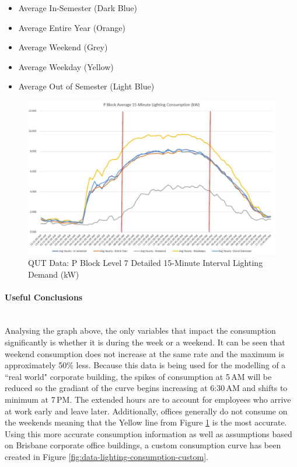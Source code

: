 \begin{itemize} [noitemsep]
	\item Average In-Semester (Dark Blue)
	\item Average Entire Year (Orange)
	\item Average Weekend (Grey)
	\item Average Weekday (Yellow)
	\item Average Out of Semester (Light Blue)
\end{itemize}

\begin{figure}[H]
	\hfill\includegraphics[width = 150mm]{images/metering/pme/pblock-lvl7-daily-avg-kw-detailed}\hspace*{\fill}
	\caption{QUT Data: P Block Level 7 Detailed 15-Minute Interval Lighting Demand (kW)} 
	\label{fig:pblock-lvl7-15-minute-detailed}
\end{figure}
  
\paragraph{Useful Conclusions}
~\\
Analysing the graph above, the only variables that impact the consumption significantly is whether it is during the week or a weekend. It can be seen that weekend consumption does not increase at the same rate and the maximum is approximately 50\% less. Because this data is being used for the modelling of a ``real world" corporate building, the spikes of consumption at 5\,AM will be reduced so the gradiant of the curve begins increasing at 6:30\,AM and shifts to minimum at 7\,PM. The extended hours are to account for employees who arrive at work early and leave later.  Additionally, offices generally do not consume on the weekends meaning that the Yellow line from Figure \ref{fig:pblock-lvl7-15-minute-detailed} is the most accurate. Using this more accurate consumption information as well as assumptions based on Brisbane corporate office buildings, a custom consumption curve has been created in Figure \ref{fig:data-lighting-consumption-custom}.     

